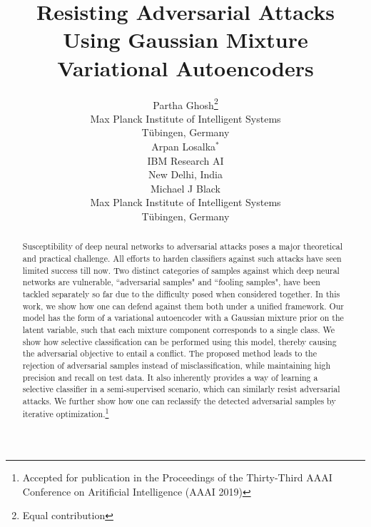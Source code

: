 \documentclass[letterpaper]{article} %
\begin{document}
%
\title{Resisting Adversarial Attacks Using Gaussian Mixture Variational Autoencoders}
\author{  Partha Ghosh\thanks{Equal contribution} \\
  Max Planck Institute of Intelligent Systems\\
  T\"{u}bingen, Germany\\
  \And
  Arpan Losalka$^*$\\
  IBM Research AI\\
  New Delhi, India \\
  \And
  Michael J Black \\
  Max Planck Institute of Intelligent Systems\\
  T\"{u}bingen, Germany\\
}
\maketitle
\begin{abstract}
Susceptibility of deep neural networks to adversarial attacks poses a major theoretical and practical challenge. All efforts to harden classifiers against such attacks have seen limited success till now. Two distinct categories of samples against which deep neural networks are vulnerable, ``adversarial samples" and ``fooling samples", have been tackled separately so far due to the difficulty posed when considered together. In this work, we show how one can defend against them both under a unified framework. Our model has the form of a variational autoencoder with a Gaussian mixture prior on the latent variable, such that each mixture component corresponds to a single class. We show how selective classification can be performed using this model, thereby causing the adversarial objective to entail a conflict. The proposed method leads to the rejection of adversarial samples instead of misclassification, while maintaining high precision and recall on test data. It also inherently provides a way of learning a selective classifier in a semi-supervised scenario, which can similarly resist adversarial attacks. We further show how one can reclassify the detected adversarial samples by iterative optimization.\footnote{Accepted for publication in the Proceedings of the Thirty-Third AAAI Conference on Aritificial Intelligence (AAAI 2019)}
\end{abstract}
\end{document}
